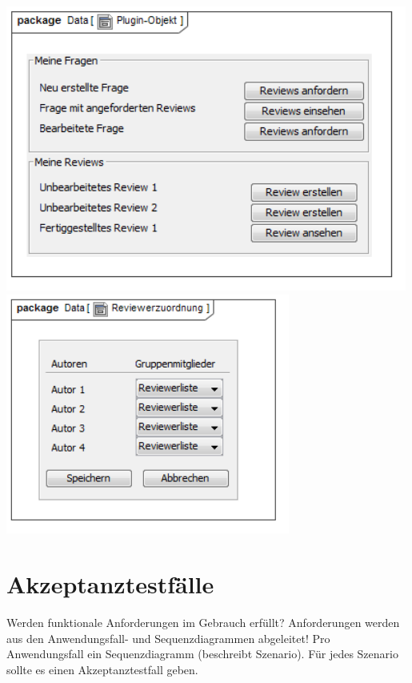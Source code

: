 \documentclass[a4paper]{scrreprt}
\begin{document}
\includegraphics[width=0.99\textwidth]{User_Interface_Modeling_Diagram__Plugin-Objekt.png}
\label{Grafische Benutzeroberfläche Autor}
\\
\includegraphics[width=0.7\textwidth]{User_Interface_Modeling_Diagram__Reviewerzuordnung.png}
\label{Grafische Benutzeroberfläche Autor}


\chapter{Akzeptanztestfälle}
Werden funktionale Anforderungen im Gebrauch erfüllt?
Anforderungen werden aus den Anwendungsfall- und Sequenzdiagrammen abgeleitet!
Pro Anwendungsfall ein Sequenzdiagramm (beschreibt Szenario).
Für jedes Szenario sollte es einen Akzeptanztestfall geben.\\
\end{document}
